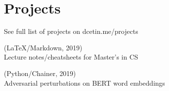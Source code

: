 \section{Projects}
See full list of projects on dcetin.me/projects

\begin{multicols}{2}
    \begin{denseouterlist}
        \item
            (LaTeX/Markdown, 2019) \\
            Lecture notes/cheatsheets for Master's in CS

        \item
            (Python/Chainer, 2019) \\
            Adversarial perturbations on BERT word embeddings
    \end{denseouterlist}
\end{multicols}